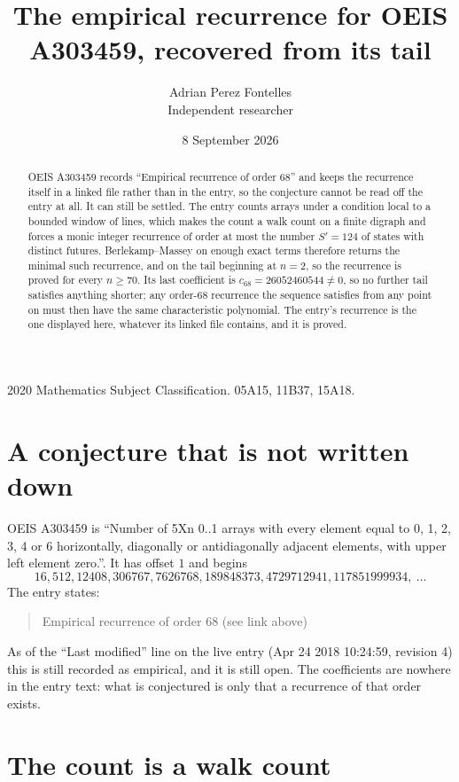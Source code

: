 \documentclass[11pt,a4paper]{article}
\title{The empirical recurrence for OEIS A303459, recovered from its tail}
\author{Adrian Perez Fontelles\\ \small Independent researcher}
\date{8 September 2026}
\theoremstyle{plain}
\theoremstyle{definition}
\begin{document}
\maketitle

\begin{abstract}
OEIS A303459 records ``Empirical recurrence of order $68$'' and keeps the recurrence itself in
a linked file rather than in the entry, so the conjecture cannot be read off the entry at all.
It can still be settled. The entry counts arrays under a condition local to a bounded window of
lines, which makes the count a walk count on a finite digraph and forces a monic integer
recurrence of order at most the number $S'=124$ of states with distinct futures. Berlekamp--Massey on
enough exact terms therefore returns the minimal such recurrence, and on the tail beginning at $n=2$, so the recurrence is proved for every $n\ge70$.
Its last coefficient is $c_{68}=26052460544\neq0$, so no further tail satisfies anything
shorter; any order-$68$ recurrence the sequence satisfies from any point on must then have
the same characteristic polynomial. The entry's recurrence is the one displayed here, whatever
its linked file contains, and it is proved.
\end{abstract}

\noindent\small 2020 Mathematics Subject Classification. 05A15, 11B37, 15A18.\normalsize

\section{A conjecture that is not written down}

OEIS A303459 is ``Number of 5Xn 0..1 arrays with every element equal to 0, 1, 2, 3, 4 or 6 horizontally, diagonally or antidiagonally adjacent elements, with upper left element zero.''. It has offset $1$ and begins
\[
16, 512, 12408, 306767, 7626768, 189848373, 4729712941, 117851999934,\ \dots
\]
The entry states:
\begin{quote}
Empirical recurrence of order 68 (see link above)
\end{quote}
As of the ``Last modified'' line on the live entry (Apr 24 2018 10:24:59, revision 4)
this is still recorded as empirical, and it is still open. The coefficients are nowhere in the
entry text: what is conjectured is only that a recurrence of that order exists.

\section{The count is a walk count}
\end{document}
